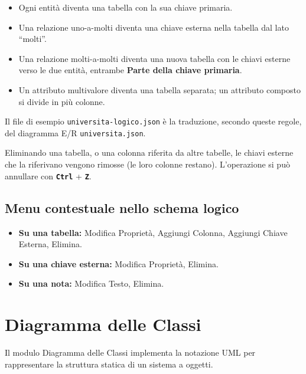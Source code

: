 \documentclass[a4paper,11pt]{article}
\newcommand{\key}[1]{\texttt{\textbf{#1}}}
\newcommand{\uielement}[1]{\textbf{#1}}
\begin{document}
\begin{tcolorbox}[tipbox, title={Dallo schema E/R allo schema logico}]
  \begin{itemize}
    \item Ogni entità diventa una tabella con la sua chiave primaria.
    \item Una relazione uno-a-molti diventa una chiave esterna nella tabella dal lato ``molti''.
    \item Una relazione molti-a-molti diventa una nuova tabella con le chiavi esterne verso le
          due entità, entrambe \uielement{Parte della chiave primaria}.
    \item Un attributo multivalore diventa una tabella separata; un attributo composto si divide
          in più colonne.
  \end{itemize}
  Il file di esempio \texttt{universita-logico.json} è la traduzione, secondo queste regole, del
  diagramma E/R \texttt{universita.json}.
\end{tcolorbox}

\begin{tcolorbox}[warnbox, title={Attenzione}]
  Eliminando una tabella, o una colonna riferita da altre tabelle, le chiavi esterne che la
  riferivano vengono rimosse (le loro colonne restano). L'operazione si può annullare con
  \key{Ctrl} + \key{Z}.
\end{tcolorbox}

\subsection{Menu contestuale nello schema logico}

\begin{itemize}
  \item \textbf{Su una tabella:} Modifica Proprietà, Aggiungi Colonna, Aggiungi Chiave Esterna,
        Elimina.
  \item \textbf{Su una chiave esterna:} Modifica Proprietà, Elimina.
  \item \textbf{Su una nota:} Modifica Testo, Elimina.
\end{itemize}

\Needspace{14cm}
\section{Diagramma delle Classi}
\label{sec:class}

Il modulo Diagramma delle Classi implementa la notazione UML per rappresentare la struttura
statica di un sistema a oggetti.
\end{document}

